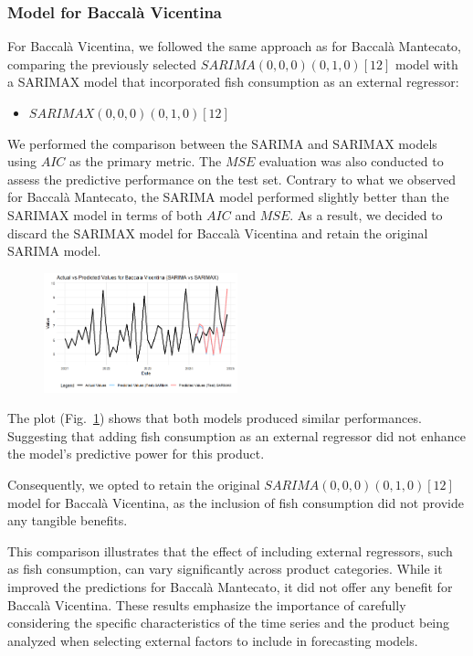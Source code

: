 \documentclass[10pt,twocolumn,letterpaper]{article}
\begin{document}
\subsubsection{Model for Baccalà Vicentina}

For Baccalà Vicentina, we followed the same approach as for Baccalà Mantecato, comparing the previously selected $SARIMA(0,0,0)(0,1,0)[12]$ model with a SARIMAX model that incorporated fish consumption as an external regressor:

\begin{itemize}
    \item $SARIMAX(0,0,0)(0,1,0)[12]$
\end{itemize}

We performed the comparison between the SARIMA and SARIMAX models using $AIC$ as the primary metric. The $MSE$ evaluation was also conducted to assess the predictive performance on the test set. Contrary to what we observed for Baccalà Mantecato, the SARIMA model performed slightly better than the SARIMAX model in terms of both $AIC$ and $MSE$. As a result, we decided to discard the SARIMAX model for Baccalà Vicentina and retain the original SARIMA model.

\begin{figure}[h!]
    \centering
    \includegraphics[width=0.5\textwidth]{PlotsBEFD/V_COMPARE_SARIMAX_SARIMA_TEST_PRED.png} 
    \caption{}
    \label{fig:V_COMPARE_SARIMAX_SARIMA_TEST_PRED}
\end{figure}

The plot (Fig.~\ref{fig:V_COMPARE_SARIMAX_SARIMA_TEST_PRED}) shows that both models produced similar performances. Suggesting that adding fish consumption as an external regressor did not enhance the model’s predictive power for this product.

Consequently, we opted to retain the original $SARIMA(0,0,0)(0,1,0)[12]$ model for Baccalà Vicentina, as the inclusion of fish consumption did not provide any tangible benefits.

This comparison illustrates that the effect of including external regressors, such as fish consumption, can vary significantly across product categories. While it improved the predictions for Baccalà Mantecato, it did not offer any benefit for Baccalà Vicentina. These results emphasize the importance of carefully considering the specific characteristics of the time series and the product being analyzed when selecting external factors to include in forecasting models.
\end{document}
